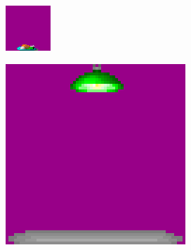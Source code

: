   \begin{minipage}{.5\textwidth} 
     \includegraphics[width=\textwidth]{screenshots/sprite_food.png} 
   \end{minipage}
  \begin{minipage}{.5\textwidth} 
     \includegraphics[width=\textwidth]{screenshots/light_sprite.png}
   \end{minipage}

